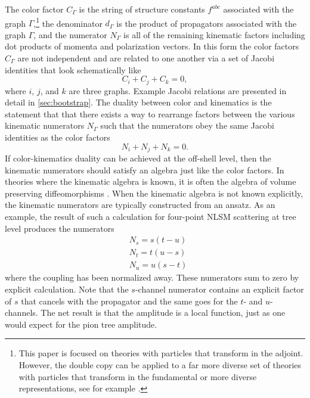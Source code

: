 \documentclass[11pt,letter]{article}
\begin{document}
The color factor
$C_\Gamma$ is the string of structure constants $f^{abc}$ associated
with the graph $\Gamma$,\footnote{This paper is focused on theories
  with particles that transform in the adjoint.  However, the double
  copy can be applied to a far more diverse set of theories with
  particles that transform in the fundamental or more diverse
  representations, see for example \cite{Johansson:2017srf,
    Johansson2014zca, Johansson:2015oia, Johansson:2019dnu, Carrasco:2020ywq,Carrasco:2022jxn,
    Carrasco:2023vjg}.}  the denominator $d_\Gamma$
is the product of propagators associated with the graph $\Gamma$, and
the numerator $N_\Gamma$ is all of the remaining kinematic factors
including dot products of momenta and polarization vectors. In this 
form the color factors $C_\Gamma$ are not independent and are related to
one another via a set of Jacobi identities that look schematically
like
\begin{equation}
C_i+C_j+C_k=0,
\end{equation}
where $i$, $j$, and $k$ are three graphs.  Example Jacobi relations
are presented in detail in \cref{sec:bootstrap}. The duality between color and kinematics is the statement that that there exists a way to rearrange factors between
the various kinematic numerators $N_\Gamma$ such that the numerators
obey the same Jacobi identities as the color factors
\begin{equation}
N_i +N_j +N_k=0.
\end{equation}
If color-kinematics duality can be achieved at the off-shell level,
then the kinematic numerators should satisfy an algebra just like the
color factors.  In theories where the kinematic algebra is known, it
is often the algebra of volume preserving diffeomorphisms
\cite{Monteiro2011pc, Ben-Shahar:2021zww, Cheung:2020djz,
  Cheung:2021zvb, Cheung:2022mix}.
When the kinematic algebra is not known explicitly, the kinematic numerators are typically constructed from an ansatz.
As an example, the result of such a calculation for four-point NLSM scattering at tree level produces the numerators
\begin{align}
&N_s = s(t-u)\\
&N_t = t(u-s)\\
&N_u = u(s-t)
\end{align}
where the coupling has been normalized away.  These numerators sum to
zero by explicit calculation.  Note that the $s$-channel numerator
contains an explicit factor of $s$ that cancels with the propagator
and the same goes for the $t$- and $u$-channels.
The net result is that the amplitude is a local function, just as one would expect for the pion tree
amplitude.
\end{document}
